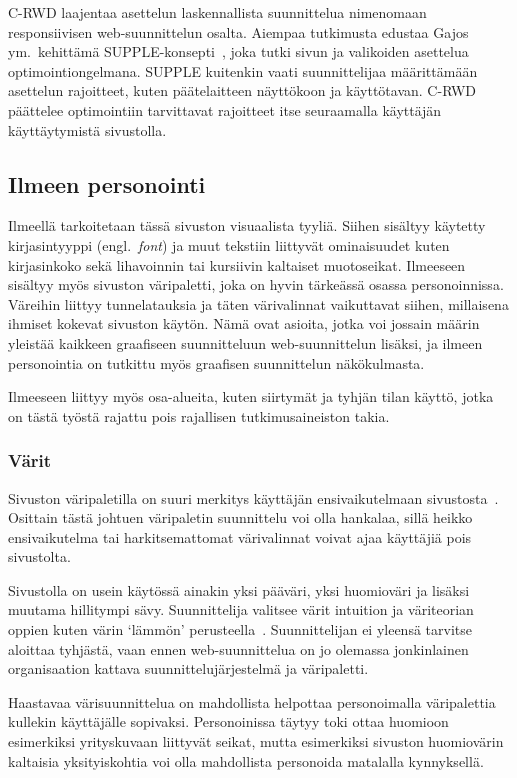 \documentclass[finnish, 12pt, a4paper, elec, utf8, a-1b, online]{aaltothesis}
\begin{document}
C-RWD laajentaa asettelun laskennallista suunnittelua nimenomaan responsiivisen
web-suunnittelun osalta. Aiempaa tutkimusta edustaa Gajos ym.~kehittämä
SUPPLE-konsepti~\cite{10.1145/964442.964461}, joka tutki sivun ja valikoiden
asettelua optimointiongelmana. SUPPLE kuitenkin vaati suunnittelijaa
määrittämään asettelun rajoitteet, kuten päätelaitteen näyttökoon ja
käyttötavan. C-RWD päättelee optimointiin tarvittavat rajoitteet itse
seuraamalla käyttäjän käyttäytymistä sivustolla.

\subsection{Ilmeen personointi}

Ilmeellä tarkoitetaan tässä sivuston visuaalista tyyliä. Siihen sisältyy
käytetty kirjasintyyppi (engl.~\textit{font}) ja muut tekstiin liittyvät
ominaisuudet kuten kirjasinkoko sekä lihavoinnin tai kursiivin kaltaiset
muotoseikat. Ilmeeseen sisältyy myös sivuston väripaletti, joka on hyvin
tärkeässä osassa personoinnissa. Väreihin liittyy tunnelatauksia ja täten
värivalinnat vaikuttavat siihen, millaisena ihmiset kokevat sivuston käytön.
Nämä ovat asioita, jotka voi jossain määrin yleistää kaikkeen graafiseen
suunnitteluun web-suunnittelun lisäksi, ja ilmeen personointia on tutkittu myös
graafisen suunnittelun näkökulmasta.

Ilmeeseen liittyy myös osa-alueita, kuten siirtymät ja tyhjän tilan käyttö,
jotka on tästä työstä rajattu pois rajallisen tutkimusaineiston takia.

\subsubsection{Värit}

Sivuston väripaletilla on suuri merkitys käyttäjän ensivaikutelmaan
sivustosta~\cite{10.1145/2470654.2481281}. Osittain tästä johtuen väripaletin
suunnittelu voi olla hankalaa, sillä heikko ensivaikutelma tai harkitsemattomat
värivalinnat voivat ajaa käyttäjiä pois sivustolta.

Sivustolla on usein käytössä ainakin yksi pääväri, yksi huomioväri ja
lisäksi muutama hillitympi sävy. Suunnittelija valitsee värit intuition ja
väriteorian oppien kuten värin `lämmön' perusteella~\cite{odonovan_2015}.
Suunnittelijan ei yleensä tarvitse aloittaa tyhjästä, vaan ennen
web-suunnittelua on jo olemassa jonkinlainen organisaation kattava
suunnittelujärjestelmä ja väripaletti.

Haastavaa värisuunnittelua on mahdollista helpottaa personoimalla väripalettia
kullekin käyttäjälle sopivaksi. Personoinissa täytyy toki ottaa huomioon
esimerkiksi yrityskuvaan liittyvät seikat, mutta esimerkiksi sivuston
huomiovärin kaltaisia yksityiskohtia voi olla mahdollista personoida matalalla
kynnyksellä.
\end{document}
